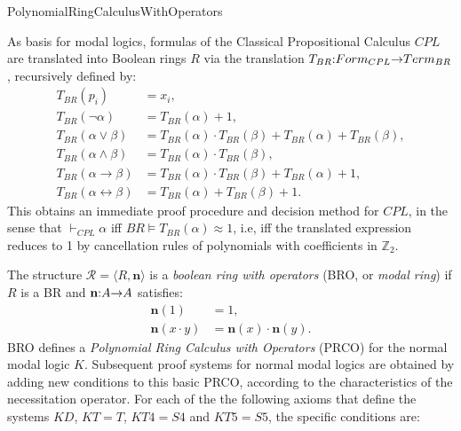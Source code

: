 \begin{entry}{PolynomialRingCalculusWithOperators}  

\newcommand{\fn}[3]{#1\negthickspace : \negthickspace #2 \negthickspace\to\negthickspace #3}
\def\n{\textbf{n}}
\newcommand{\vdashp}{\vdash_{\approx}}

\begin{calculus} 
 
 As  basis  for modal logics, formulas of   the  Classical Propositional Calculus $CPL$ are translated into  Boolean rings   $R$   via  the translation $\fn{T_{BR}}{Form_{CPL}}{Term_{BR}}$, recursively defined by:
\begin{align}   
	T_{BR}(p_i) &= x_i,\\
	T_{BR}(\neg \alpha) &= T_{BR}(\alpha) + 1,\\
	T_{BR}(\alpha \vee \beta) &= T_{BR}(\alpha) \cdot T_{BR}(\beta) + T_{BR}(\alpha) + T_{BR}(\beta),\\
	T_{BR}(\alpha \wedge \beta) &= T_{BR}(\alpha) \cdot T_{BR}(\beta),\\
	T_{BR}(\alpha \to \beta) &= T_{BR}(\alpha) \cdot T_{BR}(\beta) + T_{BR}(\alpha) + 1,\\
	T_{BR}(\alpha \leftrightarrow \beta) &= T_{BR}(\alpha) + T_{BR}(\beta) + 1. 
\end{align}
This obtains an  immediate  proof  procedure and decision  method for $CPL$, in the sense that
 $\vdash_{CPL} \alpha$ iff  $BR \vDash T_{BR}(\alpha) \approx 1$,
i.e, iff the translated expression reduces to 1 by cancellation rules of  polynomials with  coefficients
in $\mathbb{Z}_{2}$.
 
 The  structure   $\mathcal{R}=\langle R,  \n \rangle$ is a \emph{boolean ring with operators} (BRO, or \emph{modal ring})  if $R$ is a BR and $\fn{\n}{A}{A}$ satisfies:
	\begin{align*}
		\n(1) &= 1,\\
		\n(x \cdot y) &= \n(x) \cdot \n(y).
	\end{align*}
BRO defines a   \emph{Polynomial Ring Calculus with Operators} (PRCO) for the  normal modal  logic   $K$. Subsequent  proof  systems for  normal modal logics are obtained by adding  new conditions to this basic PRCO, according to the characteristics of the   necessitation operator. For each of the  the following axioms that   define the systems $KD$, $KT= T$, $KT4 = S4$ and $KT5= S5$,  the specific  conditions are:



\end{calculus}
\end{entry}
